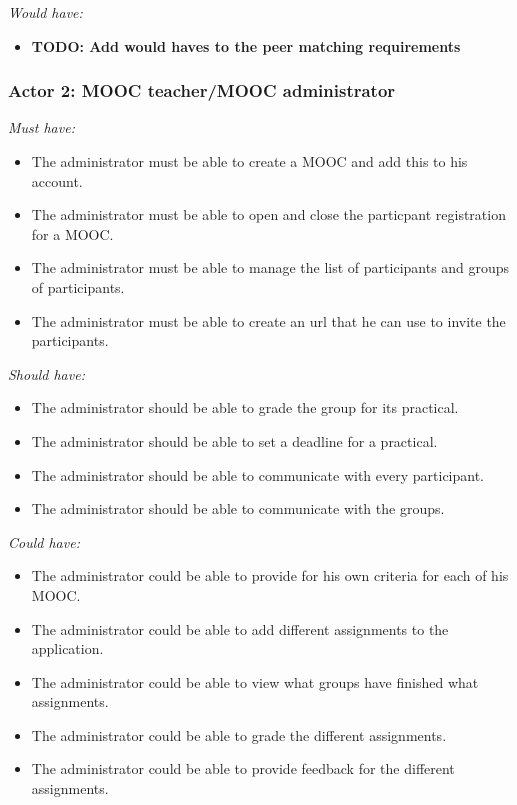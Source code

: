 \documentclass[]{article}
\newcommand{\TODO}[1]{{\color{red}\textbf{TODO: #1}}}
\newcommand{\reqr}[1]{{\noindent\emph{#1:}}}
\begin{document}
\reqr{Would have}
\begin{itemize}
\item \TODO{Add would haves to the peer matching requirements}
\end{itemize}


\subsubsection{Actor 2: MOOC teacher/MOOC administrator}

\reqr{Must have}
\begin{itemize}
\item The administrator must be able to create a MOOC and add this to his account.
\item The administrator must be able to open and close the particpant registration for a MOOC.
\item The administrator must be able to manage the list of participants and groups of participants.
\item The administrator must be able to create an url that he can use to invite the participants.
\end{itemize}

\reqr{Should have}
\begin{itemize}
\item The administrator should be able to grade the group for its practical.
\item The administrator should be able to set a deadline for a practical.
\item The administrator should be able to communicate with every participant.
\item The administrator should be able to communicate with the groups.
\end{itemize}

\reqr{Could have}
\begin{itemize}
\item The administrator could be able to provide for his own criteria for each of his MOOC.
\item The administrator could be able to add different assignments to the application.
\item The administrator could be able to view what groups have finished what assignments.
\item The administrator could be able to grade the different assignments.
\item The administrator could be able to provide feedback for the different assignments.
\end{itemize}
\end{document}
